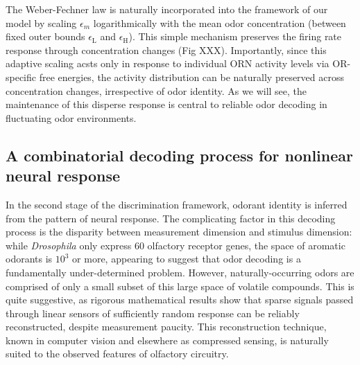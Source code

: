 The Weber-Fechner law is naturally incorporated into the framework of our model by scaling $\epsilon_m$ logarithmically with the mean odor concentration (between fixed outer bounds $\epsilon_{\text {L}}$ and $\epsilon_{\text {H}}$). This simple mechanism preserves the firing rate response through concentration changes (Fig XXX). Importantly, since this adaptive scaling acsts only in response to individual ORN activity levels via OR-specific free energies, the activity distribution can be naturally preserved across concentration changes, irrespective of odor identity. As we will see, the maintenance of this disperse response is central to reliable odor decoding in fluctuating odor environments. 


\subsection*{A combinatorial decoding process for nonlinear neural response}

In the second stage of the discrimination framework, odorant identity is inferred from the pattern of neural response. The complicating factor in this decoding process is the disparity between measurement dimension and stimulus dimension: while \textit{Drosophila} only express 60 olfactory receptor genes, the space of aromatic odorants is $10^3$ or more, appearing to suggest that odor decoding is a fundamentally under-determined problem. However, naturally-occurring odors are comprised of only a small subset of this large space of volatile compounds. This is quite suggestive, as rigorous mathematical results show that sparse signals passed through linear sensors of sufficiently random response can be reliably reconstructed, despite measurement paucity. %
This reconstruction technique, known in computer vision and elsewhere as compressed sensing, is naturally suited to the observed features of olfactory circuitry. %

